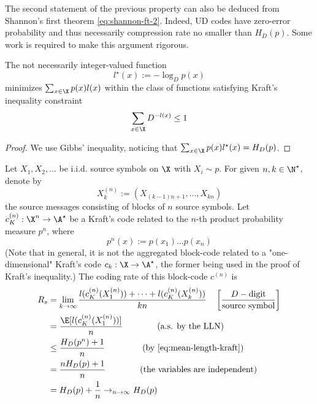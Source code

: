 \documentclass[toc, titlepaged]{../cs-classes/cs-classes}
\begin{document}
\begin{remark}
    The second statement of the previous property can also be deduced from Shannon's first theorem \eqref{eq:shannon-ft-2}. Indeed, UD codes have zero-error probability and thus necessarily compression rate no smaller than $H_D(p)$. Some work is required to make this argument rigorous.
\end{remark}

\begin{property}
    The not necessarily integer-valued function
    \begin{equation*}
        l^\star(x):=-\log_Dp(x)
    \end{equation*}
    minimizes $\sum_{x\in\X}p(x)l(x)$ within the class of functions satisfying Kraft's inequality constraint
    \begin{equation*}
        \sum_{x\in\X}D^{-l(x)}\leq 1
    \end{equation*}
\end{property}

\begin{proof}
    We use Gibbs' inequality, noticing that $\sum_{x\in\X}p(x)l^\star(x)=H_D(p)$.
\end{proof}

\begin{corollary}
    Let $X_1, X_2, \dots$ be i.i.d. source symbols on $\X$ with $X_i\sim p$. For given $n, k\in\N^\star$, denote by
    \begin{equation*}
        X_k^{(n)} := (X_{(k-1)n+1}, \dots, X_{kn})
    \end{equation*}
    the source messages consisting of blocks of $n$ source symbols. Let $c_K^{(n)}:\X^n \to \A^\star$ be a Kraft's code related to the $n$-th product probability measure $p^n$, where 
    \begin{equation*}
        p^n(x):=p(x_1)\dots p(x_n)
    \end{equation*}
    (Note that in general, it is not the aggregated block-code related to a "one-dimensional" Kraft's code $c_k:\X\to\A^\star$, the former being used in the proof of Kraft's inequality.) The coding rate of this block-code $c^{(n)}$ is
    \begin{equation*}
        \begin{aligned}
            R_s &= \lim_{k\to\infty} \frac{l(c_K^{(n)}(X_1^{(n)}))+\dots+l(c_K^{(n)}(X_k^{(n)}))}{kn} \quad \left[\frac{D-\textnormal{digit}}{\textnormal{source symbol}}\right]\\
            &= \frac{\E[l(c_K^{(n)}(X_1^{(n)}))]}{n} \qquad\qquad \textnormal{(a.s. by the LLN)}\\
            &\leq \frac{H_D(p^n)+1}{n} \qquad\qquad \textnormal{(by \eqref{eq:mean-length-kraft})}\\
            &= \frac{nH_D(p)+1}{n} \qquad\qquad \textnormal{(the variables are independent)}\\
            &=H_D(p)+\frac{1}{n} \to_{n\to\infty} H_D(p)
        \end{aligned}
    \end{equation*}
\end{corollary}
\end{document}
